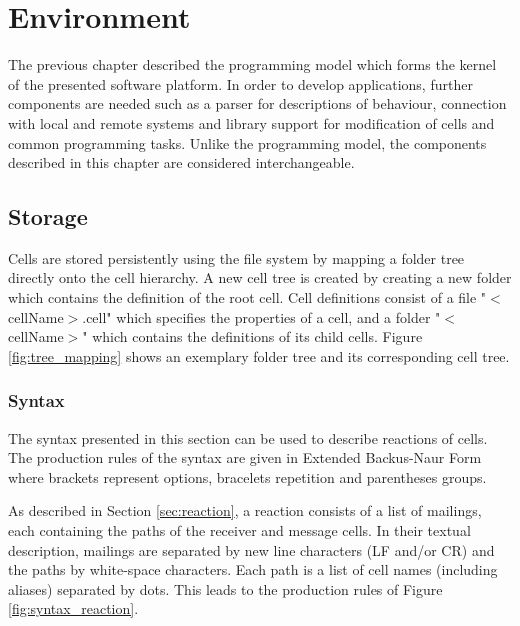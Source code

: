 
\graphicspath{{figures/development_environment/}}

\chapter{Environment}
\label{chap:development_environment}

The previous chapter described the programming model which forms the kernel of the presented software platform. In order to develop applications, further components are needed such as a parser for descriptions of behaviour, connection with local and remote systems and library support for modification of cells and common programming tasks. Unlike the programming model, the components described in this chapter are considered interchangeable.


\section{Storage}
\label{sec:storage}

Cells are stored persistently using the file system by mapping a folder tree directly onto the cell hierarchy. A new cell tree is created by creating a new folder which contains the definition of the root cell. Cell definitions consist of a file "$<$cellName$>$.cell" which specifies the properties of a cell, and a folder "$<$cellName$>$" which contains the definitions of its child cells. Figure \ref{fig:tree_mapping} shows an exemplary folder tree and its corresponding cell tree.


\subsection{Syntax}

The syntax presented in this section can be used to describe reactions of cells. The production rules of the syntax are given in Extended Backus-Naur Form where brackets represent options, bracelets repetition and parentheses groups.

As described in Section \ref{sec:reaction}, a reaction consists of a list of mailings, each containing the paths of the receiver and message cells. In their textual description, mailings are separated by new line characters (LF and/or CR) and the paths by white-space characters. Each path is a list of cell names (including aliases) separated by dots. This leads to the production rules of Figure \ref{fig:syntax_reaction}.

